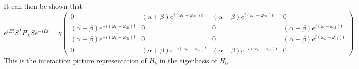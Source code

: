 \documentclass[../Thesis.tex]{subfiles}
\begin{document}
It can then be shown that
\begin{dmath} 
e^{iEt} S^T H_k S e^{-iEt} =
\gamma\begin{pmatrix}
0 &(\alpha+\beta)e^{i(\omega_k-\omega_{21})t} &(\alpha-\beta)e^{i(\omega_k-\omega_{31})t} &0\\
(\alpha+\beta)e^{-i(\omega_k-\omega_{21})t} &0 &0 &(\alpha+\beta)e^{i(\omega-\omega_{42})t}\\
(\alpha-\beta)e^{-i(\omega_k-\omega_{31})t} &0 &0 &(\alpha-\beta)e^{i(\omega_k-\omega_{43})t}\\
0 &(\alpha+\beta)e^{-i(\omega_k-\omega_{42})t} &(\alpha-\beta)e^{-i(\omega_k-\omega_{43})t} &0
\end{pmatrix}.
\end{dmath}
This is the interaction picture representation of $H_k$ in the eigenbasis of $H_0$. 
\end{document}
